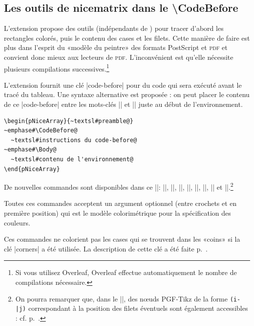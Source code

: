 \documentclass[dvipsnames]{article}%
\begin{document}
\subsection{Les outils de nicematrix dans le \textbackslash CodeBefore}

\label{color-in-code-before}

L'extension  propose des outils (indépendants de )
pour tracer d'abord les rectangles colorés, puis le contenu des cases et les
filets. Cette manière de faire est plus dans l'esprit du «modèle du peintre» des
formats PostScript et \textsc{pdf} et convient donc mieux aux lecteurs de
\textsc{pdf}. L'inconvénient est qu'elle nécessite plusieurs compilations
successives.\footnote{Si vous utilisez Overleaf, Overleaf effectue
  automatiquement le nombre de
  compilations nécessaire.}

\medskip
L'extension  fournit une clé |code-before| pour du code qui sera
exécuté avant le tracé du tableau. Une syntaxe alternative est proposée : on
peut placer le contenu de ce |code-before| entre les mots-clés |\CodeBefore| et
|\Body| juste au début de l'environnement.

\begin{Verbatim}
\begin{pNiceArray}{~textsl#preamble@}
~emphase#\CodeBefore@
  ~textsl#instructions du code-before@
~emphase#\Body@
  ~textsl#contenu de l'environnement@
\end{pNiceArray}
\end{Verbatim}

\smallskip
De nouvelles commandes sont disponibles dans ce |\CodeBefore|: |\cellcolor|,
|\rectanglecolor|, |\rowcolor|, |\columncolor|, |\rowcolors|, |\rowlistcolors|,
|\chessboardcolors| et |\arraycolor|.\footnote{On pourra remarquer que, dans le
  |\CodeBefore|, des nœuds PGF-Tikz de la forme \verb+(i-|j)+ correspondant à la
  position des filets éventuels sont également accessibles : cf.
  p.~\pageref{nodes-i}.}
\label{code-before}

\medskip
Toutes ces commandes acceptent un argument optionnel (entre crochets et en
première position) qui est le modèle colorimétrique pour la spécification des
couleurs.

\medskip
Ces commandes ne colorient pas les cases qui se trouvent dans les «coins» si la
clé |corners| a été utilisée. La description de cette clé a été faite
p.~\pageref{corners}.
\end{document}
